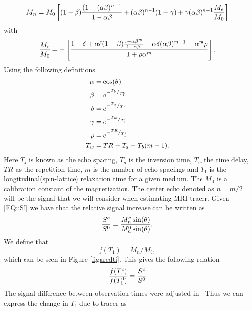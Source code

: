 \documentclass[11pt,a4paper]{article}
\begin{document}
\begin{equation}
M_{n} = M_{0}  \left[ (1-\beta)\frac{(1-(\alpha \beta)\sp{n-1} }{1-\alpha\beta} + (\alpha \beta)\sp{n-1}(1-\gamma) + \gamma ( \alpha \beta)\sp{n-1} \frac{M_{e}}{M_{0}}  \right]   
\end{equation}
with 
\begin{equation}
\frac{M_{e}}{M_{0}} = - \left[ \frac{ 1 -\delta + \alpha \delta (1-\beta ) \frac{1-\alpha\beta\sp{m}}{1-\alpha \beta} + \alpha\delta(\alpha\beta)\sp{m-1} - \alpha\sp{m}\rho}{1 +\rho \alpha\sp{m} } \right].
\end{equation}
Using the following definitions
\begin{equation}
\begin{aligned}
\alpha &= \cos ( \theta ) \\
\beta  &= e\sp{- \sp{T_b}/_{T_1\sp{c}} } \\
\delta &= e\sp{- \sp{T_a}/_{T_1\sp{c}} } \\
\gamma &= e\sp{- \sp{T_w}/_{T_1\sp{c}} } \\
\rho   &= e\sp{- \sp{TR}/_{T_1\sp{c}}}  \\
T_w    &= TR - T_a -T_b(m-1)       .\\
\end{aligned}
\end{equation}
Here $T_b$ is known as the echo spacing, $T_a$ is the inversion time, $T_w$ the time delay, $TR$ as the repetition time, $m$ is the number of echo spacings and $T_1$ is the longitudinal(spin-lattice) relaxation time for a given medium. The $M_0$ is a calibration constant of the magnetization. The center echo denoted as $n=m/2$ will be the signal that we will consider when estimating MRI tracer. Given \eqref{EQ::SI} we have that the relative signal increase can be written as 
\begin{equation}
\frac{S\sp{c}}{S\sp{0}} = \frac{ M_{n}\sp{c} \sin (\theta)}{ M_{n}\sp{0} \sin (\theta) }.
\end{equation}
We define that  
\begin{equation}
f(T_1) = M_{n}/M_{0} ,
\label{scaledmagnetization}
\end{equation}
which can be seen in Figure \ref{figuredti}. 
This gives the following relation 
\begin{equation}
\frac{f(T_{1}\sp{c} ) }{f(T_{1}\sp{0})}  = \frac{S\sp{c}}{S\sp{0}} 
\end{equation}
The signal difference between observation times were adjusted in \cite{eidevalnes}. Thus we can express the change in $T_1$ due to tracer as 
\end{document}
